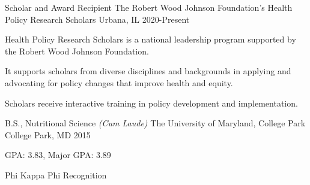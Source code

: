 \begin{cventries}
  \cventry
    {Scholar and Award Recipient} %
    {The Robert Wood Johnson Foundation's Health Policy Research Scholars} %
    {Urbana, IL} %
    {2020-Present} %
    {
      \begin{cvitems} %
        \item {Health Policy Research Scholars is a national leadership program supported by the Robert Wood Johnson Foundation.} 
        \item{It supports scholars from diverse disciplines and backgrounds in applying and advocating for policy changes that improve health and equity.}
        \item{ Scholars receive interactive training in policy development and implementation.}
      \end{cvitems}
    }


  \cventry
    {B.S., Nutritional Science \textit{(Cum Laude)}} %
    {The University of Maryland, College Park} %
    {College Park, MD} %
    {2015} %
    {
      \begin{cvitems} %
        \item {GPA: 3.83, Major GPA: 3.89}
        \item{Phi Kappa Phi Recognition}
      \end{cvitems}
    }

\end{cventries}

